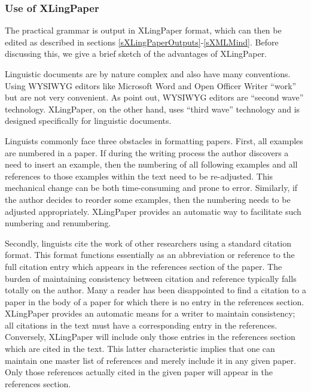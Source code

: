\subsubsection{Use of XLingPaper}\label{sXLingPaper}
The practical grammar is output in XLingPaper format, which can then be edited as described in sections \ref{sXLingPaperOutputs}-\ref{sXMLMind}.  Before discussing this, we give a brief sketch of the advantages of XLingPaper.

Linguistic documents are by nature complex and also have many conventions. Using WYSIWYG editors like Microsoft Word and Open Officer Writer ``work'' but are not very convenient. As \citet{rSimonsAndBlackSFLF} point out, WYSIWYG editors are ``second wave'' technology. XLingPaper, on the other hand, uses ``third wave'' technology and is designed specifically for linguistic documents.

Linguists commonly face three obstacles in formatting papers. First, all examples are numbered in a paper. If during the writing process the author discovers a need to insert an example, then the numbering of all following examples and all references to those examples within the text need to be re-adjusted. This mechanical change can be both time-consuming and prone to error. Similarly, if the author decides to reorder some examples, then the numbering needs to be adjusted appropriately. XLingPaper provides an automatic way to facilitate such numbering and renumbering. 

Secondly, linguists cite the work of other researchers using a standard citation format. This format functions essentially as an abbreviation or reference to the full citation entry which appears in the references section of the paper. The burden of maintaining consistency between citation and reference typically falls totally on the author. Many a reader has been disappointed to find a citation to a paper in the body of a paper for which there is no entry in the references section. XLingPaper provides an automatic means for a writer to maintain consistency; all citations in the text must have a corresponding entry in the references. Conversely, XLingPaper will include only those entries in the references section which are cited in the text. This latter characteristic implies that one can maintain one master list of references and merely include it in any given paper. Only those references actually cited in the given paper will appear in the references section. 

